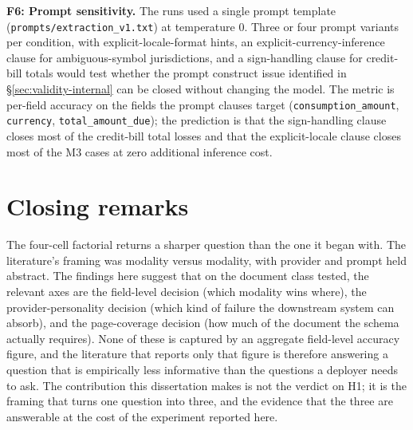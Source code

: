 \textbf{F6: Prompt sensitivity.} The runs used a single prompt template
(\texttt{prompts/extraction\_v1.txt}) at temperature 0. Three or four
prompt variants per condition, with explicit-locale-format hints, an
explicit-currency-inference clause for ambiguous-symbol jurisdictions, and
a sign-handling clause for credit-bill totals would test whether the
prompt construct issue identified in \S\ref{sec:validity-internal} can be
closed without changing the model. The metric is per-field accuracy on the
fields the prompt clauses target (\texttt{consumption\_amount},
\texttt{currency}, \texttt{total\_amount\_due}); the prediction is that the
sign-handling clause closes most of the credit-bill total losses and that
the explicit-locale clause closes most of the M3 cases at zero additional
inference cost.

\section{Closing remarks}
\label{sec:closing}

The four-cell factorial returns a sharper question than the one it began
with. The literature's framing was modality versus modality, with provider
and prompt held abstract. The findings here suggest that on the document
class tested, the relevant axes are the field-level decision (which
modality wins where), the provider-personality decision (which kind of
failure the downstream system can absorb), and the page-coverage decision
(how much of the document the schema actually requires). None of these is
captured by an aggregate field-level accuracy figure, and the literature
that reports only that figure is therefore answering a question that is
empirically less informative than the questions a deployer needs to ask.
The contribution this dissertation makes is not the verdict on H1; it is
the framing that turns one question into three, and the evidence that the
three are answerable at the cost of the experiment reported here.
